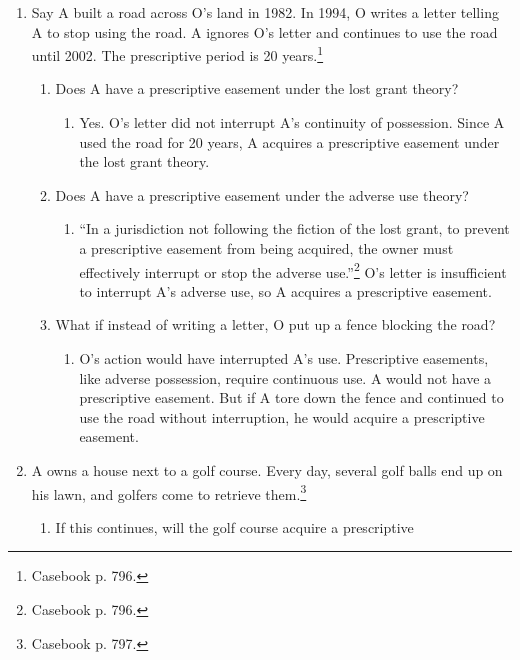 \begin{enumerate}
    \item Say A built a road across O's land in 1982. In 1994, O writes a 
    letter telling A to stop using the road. A ignores O's letter and 
    continues to use the road until 2002. The prescriptive period is 20 
    years.\footnote{Casebook p. 796.}
    \begin{enumerate}
        \item Does A have a prescriptive easement under the lost grant theory?
        \begin{enumerate}
            \item Yes. O's letter did not interrupt A's continuity of 
            possession. Since A used the road for 20 years, A acquires a 
            prescriptive easement under the lost grant theory.
        \end{enumerate}
        \item Does A have a prescriptive easement under the adverse use 
        theory?
        \begin{enumerate}
            \item ``In a jurisdiction not following the fiction of the lost 
            grant, to prevent a prescriptive easement from being acquired, the 
            owner must effectively interrupt or stop the adverse 
            use.''\footnote{Casebook p. 796.} O's letter is insufficient 
            to interrupt A's adverse use, so A acquires a prescriptive 
            easement.
        \end{enumerate}
        \item What if instead of writing a letter, O put up a fence blocking 
        the road?
        \begin{enumerate}
            \item O's action would have interrupted A's use. Prescriptive 
            easements, like adverse possession, require continuous use. A 
            would not have a prescriptive easement. But if A tore down the 
            fence and continued to use the road without interruption, he 
            would acquire a prescriptive easement.
        \end{enumerate}
    \end{enumerate}
    \item A owns a house next to a golf course. Every day, several golf balls 
    end up on his lawn, and golfers come to retrieve them.\footnote{Casebook 
    p. 797.}
    \begin{enumerate}
        \item If this continues, will the golf course acquire a prescriptive 

\end{enumerate}
\end{enumerate}
